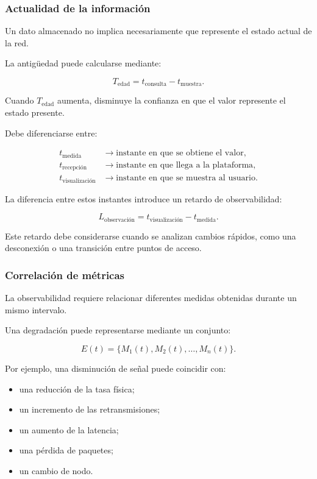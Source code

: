 \subsubsection*{Actualidad de la información}

Un dato almacenado no implica necesariamente que represente el estado
actual de la red.

La antigüedad puede calcularse mediante:

\[
    T_{\mathrm{edad}}
    =
    t_{\mathrm{consulta}}
    -
    t_{\mathrm{muestra}}.
\]

Cuando \(T_{\mathrm{edad}}\) aumenta, disminuye la confianza en que el
valor represente el estado presente.

Debe diferenciarse entre:

\[
\begin{aligned}
    t_{\mathrm{medida}}
    &\longrightarrow
    \text{instante en que se obtiene el valor},\\
    t_{\mathrm{recepción}}
    &\longrightarrow
    \text{instante en que llega a la plataforma},\\
    t_{\mathrm{visualización}}
    &\longrightarrow
    \text{instante en que se muestra al usuario}.
\end{aligned}
\]

La diferencia entre estos instantes introduce un retardo de
observabilidad:

\[
    L_{\mathrm{observación}}
    =
    t_{\mathrm{visualización}}
    -
    t_{\mathrm{medida}}.
\]

Este retardo debe considerarse cuando se analizan cambios rápidos, como
una desconexión o una transición entre puntos de acceso.


\subsubsection*{Correlación de métricas}

La observabilidad requiere relacionar diferentes medidas obtenidas
durante un mismo intervalo.

Una degradación puede representarse mediante un conjunto:

\[
    E(t)
    =
    \{
        M_1(t),
        M_2(t),
        \ldots,
        M_n(t)
    \}.
\]

Por ejemplo, una disminución de señal puede coincidir con:

\begin{itemize}
    \item una reducción de la tasa física;

    \item un incremento de las retransmisiones;

    \item un aumento de la latencia;

    \item una pérdida de paquetes;

    \item un cambio de nodo.
\end{itemize}

